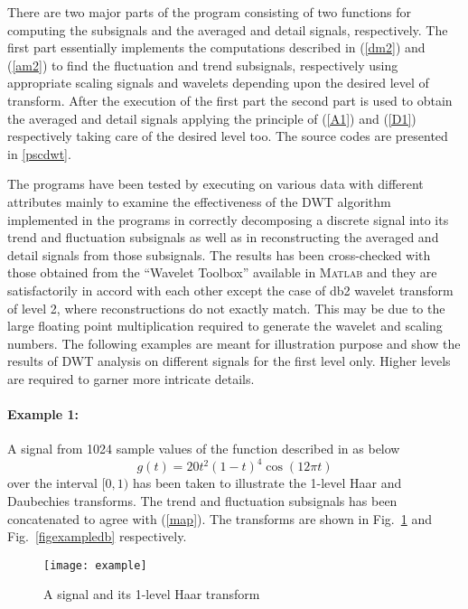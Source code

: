 \documentclass[a4paper,11pt]{article}
\begin{document}
There are two major parts of the program consisting of two functions for computing the subsignals and the averaged and detail signals, respectively. The first part essentially implements the computations described in (\ref{dm2}) and (\ref{am2}) to find the fluctuation and trend subsignals, respectively using appropriate scaling signals and wavelets depending upon the desired level of transform. After the execution of the first part the second part is used to obtain the averaged and detail signals applying the principle of (\ref{A1}) and (\ref{D1}) respectively taking care of the desired level too. The source codes are presented in \ref{pscdwt}.

The programs have been tested by executing on various data with different attributes mainly to examine the effectiveness of the DWT algorithm implemented in the programs in correctly decomposing a discrete signal into its trend and fluctuation subsignals as well as in reconstructing the averaged and detail signals from those subsignals. The results has been cross-checked with those obtained from the ``Wavelet Toolbox'' available in \textsc{Matlab} and they are satisfactorily in accord with each other except the case of db2 wavelet transform of level 2, where reconstructions do not exactly match. This may be due to the large floating point multiplication required to generate the wavelet and scaling numbers. The following examples are meant for illustration purpose and show the results of DWT analysis on different signals for the first level only. Higher levels are required to garner more intricate details.

\paragraph{Example 1:} A signal from 1024 sample values of the function described in \cite{walker} as below
\begin{displaymath}
g(t)=20t^{2}(1-t)^{4}\cos(12\pi t)
\end{displaymath}
over the interval $[0,1)$ has been taken to illustrate the 1-level Haar and Daubechies transforms. The trend and fluctuation subsignals has been concatenated to agree with (\ref{map}). The transforms are shown in Fig.~\ref{figexample} and Fig.~\ref{figexampledb} respectively. 

\begin{figure}[h]
\centering
\texttt{[image: example]}
\caption{A signal and its 1-level Haar transform} \label{figexample}
\end{figure}
\end{document}
